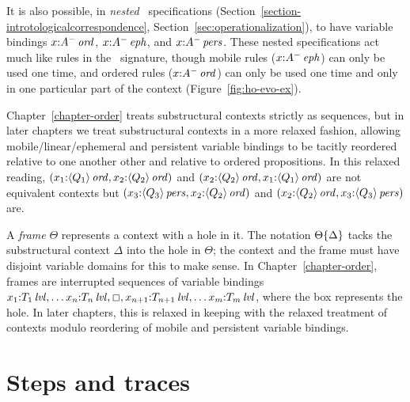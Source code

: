 It is also possible, in {\it nested} \sls~specifications
(Section~\ref{section-introtologicalcorrespondence},
Section~\ref{sec:operationalization}), to have variable bindings
$x{:}{A^-}\,{{\it ord}}$, $x{:}{A^-}\,{{\it eph}}$, and $x{:}{A^-}\,{{\it pers}}$. These
nested specifications act much like rules in the \sls~signature,
though mobile rules ($x{:}{A^-}\,{{\it eph}}$) can only be used one time, and
ordered rules ($x{:}{A^-}\,{{\it ord}}$) can only be used one time and only
in one particular part of the context (Figure~\ref{fig:ho-evo-ex}).

Chapter~\ref{chapter-order} treats substructural contexts strictly as
sequences, but in later chapters we treat substructural contexts in a
more relaxed fashion, allowing mobile/linear/ephemeral and persistent
variable bindings to be tacitly reordered relative to one another
other and relative to ordered propositions. In this relaxed reading,
$(x_1{:}{\langle {Q_1} \rangle}\,{{\it ord}}, x_2{:}{\langle {Q_2} \rangle}\,{{\it ord}})$ and
$(x_2{:}{\langle {Q_2} \rangle}\,{{\it ord}}, x_1{:}{\langle {Q_1} \rangle}\,{{\it ord}})$ are not
equivalent contexts but $(x_3{:}{\langle {Q_3} \rangle}\,{{\it pers}},
x_2{:}{\langle {Q_2} \rangle}\,{{\it ord}})$ and $(x_2{:}{\langle {Q_2} \rangle}\,{{\it ord}},
x_3{:}{\langle {Q_3} \rangle}\,{{\it pers}})$ are. %

A {\it frame}
$\Theta$ represents a context with a hole in it. The notation
${\Theta}\{{\Delta}\}$ tacks the substructural context $\Delta$
into the hole in $\Theta$; the context and the frame must have
disjoint variable domains for this to make sense. In
Chapter~\ref{chapter-order}, frames are interrupted sequences of variable
bindings
$x_1{:}{T_1}\,{{\it lvl}},\ldots x_n{:}{T_n}\,{{\it lvl}}, \Box,
x_{n+1}{:}{T_{n+1}}\,{{\it lvl}}, \ldots x_m{:}{T_{m}}\,{{\it lvl}}$, where the box
represents the hole. In later chapters, this is relaxed in
keeping with the relaxed treatment of contexts modulo reordering
of mobile and persistent variable bindings.

\section{Steps and traces}

